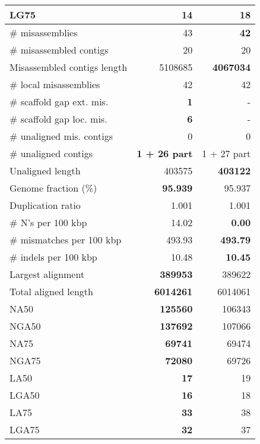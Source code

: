 \documentclass[12pt,a4paper]{article}
\begin{document}
\begin{table}[ht]
\begin{center}
\begin{tabular}{|l*{2}{|r}|}
LG75 & {\bf 14} & 18 \\ \hline
\# misassemblies & 43 & {\bf 42} \\ \hline
\# misassembled contigs & 20 & 20 \\ \hline
Misassembled contigs length & 5108685 & {\bf 4067034} \\ \hline
\# local misassemblies & 42 & 42 \\ \hline
\# scaffold gap ext. mis. & {\bf 1} & - \\ \hline
\# scaffold gap loc. mis. & {\bf 6} & - \\ \hline
\# unaligned mis. contigs & 0 & 0 \\ \hline
\# unaligned contigs & {\bf 1 + 26 part} & 1 + 27 part \\ \hline
Unaligned length & 403575 & {\bf 403122} \\ \hline
Genome fraction (\%) & {\bf 95.939} & 95.937 \\ \hline
Duplication ratio & 1.001 & 1.001 \\ \hline
\# N's per 100 kbp & 14.02 & {\bf 0.00} \\ \hline
\# mismatches per 100 kbp & 493.93 & {\bf 493.79} \\ \hline
\# indels per 100 kbp & 10.48 & {\bf 10.45} \\ \hline
Largest alignment & {\bf 389953} & 389622 \\ \hline
Total aligned length & {\bf 6014261} & 6014061 \\ \hline
NA50 & {\bf 125560} & 106343 \\ \hline
NGA50 & {\bf 137692} & 107066 \\ \hline
NA75 & {\bf 69741} & 69474 \\ \hline
NGA75 & {\bf 72080} & 69726 \\ \hline
LA50 & {\bf 17} & 19 \\ \hline
LGA50 & {\bf 16} & 18 \\ \hline
LA75 & {\bf 33} & 38 \\ \hline
LGA75 & {\bf 32} & 37 \\ \hline
\end{tabular}
\end{center}
\end{table}
\end{document}
